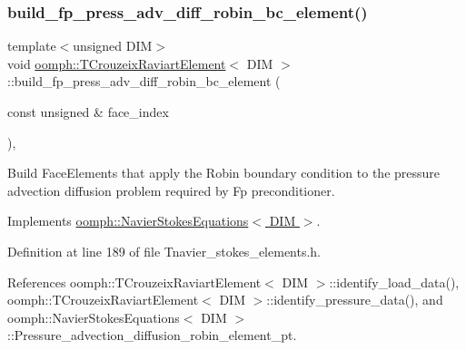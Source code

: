 \subsubsection{\texorpdfstring{build\+\_\+fp\+\_\+press\+\_\+adv\+\_\+diff\+\_\+robin\+\_\+bc\+\_\+element()}{build\_fp\_press\_adv\_diff\_robin\_bc\_element()}}
{\footnotesize\ttfamily template$<$unsigned D\+IM$>$ \\
void \hyperlink{classoomph_1_1TCrouzeixRaviartElement}{oomph\+::\+T\+Crouzeix\+Raviart\+Element}$<$ D\+IM $>$\+::build\+\_\+fp\+\_\+press\+\_\+adv\+\_\+diff\+\_\+robin\+\_\+bc\+\_\+element (\begin{DoxyParamCaption}\item[{const unsigned \&}]{face\+\_\+index }\end{DoxyParamCaption})\hspace{0.3cm}{\ttfamily [inline]}, {\ttfamily [virtual]}}



Build Face\+Elements that apply the Robin boundary condition to the pressure advection diffusion problem required by Fp preconditioner. 



Implements \hyperlink{classoomph_1_1NavierStokesEquations_a16bfab3df70ad2204217590c0e3b7de1}{oomph\+::\+Navier\+Stokes\+Equations$<$ D\+I\+M $>$}.



Definition at line 189 of file Tnavier\+\_\+stokes\+\_\+elements.\+h.



References oomph\+::\+T\+Crouzeix\+Raviart\+Element$<$ D\+I\+M $>$\+::identify\+\_\+load\+\_\+data(), oomph\+::\+T\+Crouzeix\+Raviart\+Element$<$ D\+I\+M $>$\+::identify\+\_\+pressure\+\_\+data(), and oomph\+::\+Navier\+Stokes\+Equations$<$ D\+I\+M $>$\+::\+Pressure\+\_\+advection\+\_\+diffusion\+\_\+robin\+\_\+element\+\_\+pt.

\mbox{\label{classoomph_1_1TCrouzeixRaviartElement_ac724277861641753d731cac5202f0f2c}} 
